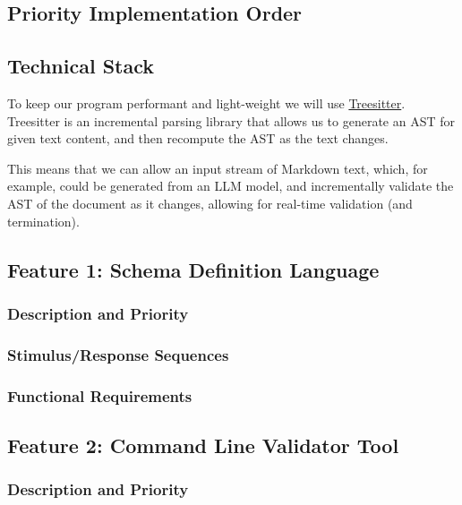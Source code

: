 \documentclass[
]{article}
\begin{document}
\subsection{Priority Implementation
Order}\label{priority-implementation-order}

\subsection{Technical Stack}\label{technical-stack}

To keep our program performant and light-weight we will use
\href{https://tree-sitter.github.io/tree-sitter/}{Treesitter}.
Treesitter is an incremental parsing library that allows us to generate
an AST for given text content, and then recompute the AST as the text
changes.

This means that we can allow an input stream of Markdown text, which,
for example, could be generated from an LLM model, and incrementally
validate the AST of the document as it changes, allowing for real-time
validation (and termination).

\subsection{Feature 1: Schema Definition
Language}\label{feature-1-schema-definition-language}

\subsubsection{Description and Priority}\label{description-and-priority}

\subsubsection{Stimulus/Response
Sequences}\label{stimulusresponse-sequences}

\subsubsection{Functional Requirements}\label{functional-requirements}

\subsection{Feature 2: Command Line Validator
Tool}\label{feature-2-command-line-validator-tool}

\subsubsection{Description and
Priority}\label{description-and-priority-1}
\end{document}
